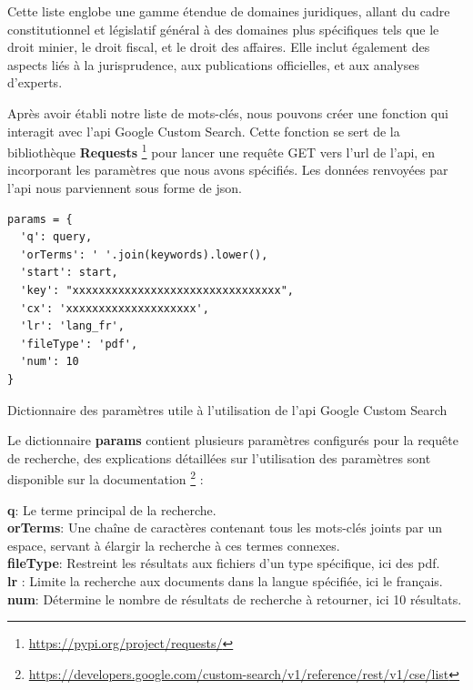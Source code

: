 Cette liste englobe une gamme étendue de domaines juridiques, allant du cadre constitutionnel et législatif général à des domaines plus spécifiques tels que le droit minier, le droit fiscal, et le droit des affaires. Elle inclut également des aspects liés à la jurisprudence, aux publications officielles, et aux analyses d'experts.

Après avoir établi notre liste de mots-clés, nous pouvons créer une fonction qui interagit avec l'\ac{api} Google Custom Search. Cette fonction se sert de la bibliothèque \textbf{Requests} \footnote{\href{https://pypi.org/project/requests/}{https://pypi.org/project/requests/}} pour lancer une requête GET vers l'\acs{url} de l'\acs{api}, en incorporant les paramètres que nous avons spécifiés. Les données renvoyées par l'\acs{api} nous parviennent sous forme de \ac{json}.

\begin{listing}[!ht]
\begin{verbatim}
params = {
  'q': query,
  'orTerms': ' '.join(keywords).lower(),
  'start': start,
  'key': "xxxxxxxxxxxxxxxxxxxxxxxxxxxxxxxx",
  'cx': 'xxxxxxxxxxxxxxxxxxxx',
  'lr': 'lang_fr',
  'fileType': 'pdf',
  'num': 10
}
\end{verbatim}
\caption{Dictionnaire des paramètres utile à l'utilisation de l'\acs{api} Google Custom Search}
\label{appendix:code:python:search-google-params}
\end{listing}

Le dictionnaire \textbf{params} contient plusieurs paramètres configurés pour la requête de recherche, des explications détaillées sur l'utilisation des paramètres sont disponible sur la documentation \footnote{\href{https://developers.google.com/custom-search/v1/reference/rest/v1/cse/list}{https://developers.google.com/custom-search/v1/reference/rest/v1/cse/list}} :

\textbf{q}: Le terme principal de la recherche. \\
\textbf{orTerms}: Une chaîne de caractères contenant tous les mots-clés joints par un espace, servant à élargir la recherche à ces termes connexes. \\
\textbf{fileType}: Restreint les résultats aux fichiers d'un type spécifique, ici des \acs{pdf}. \\
\textbf{lr} : Limite la recherche aux documents dans la langue spécifiée, ici le français. \\
\textbf{num}: Détermine le nombre de résultats de recherche à retourner, ici 10 résultats.

